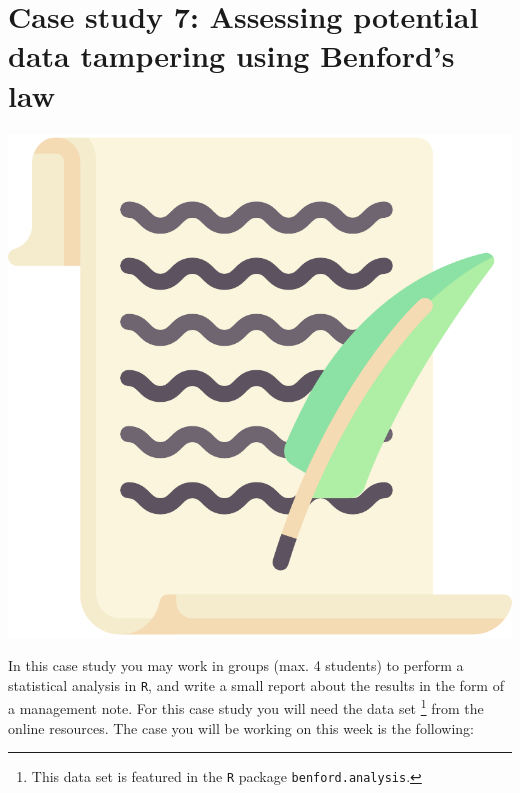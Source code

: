 
\begin{minipage}{0.8\textwidth}
\section{Case study 7: Assessing potential data tampering using Benford's law}
\end{minipage}%
\hfill%
\begin{minipage}{0.1\textwidth}
\includegraphics[width=\linewidth]{Files/Images/lettericon.pdf}
\end{minipage}
\vspace*{.1cm}

In this case study you may work in groups (max. 4 students) to perform a statistical analysis in \texttt{R}, and write a small report about the results in the form of a management note. For this case study you will need the data set \footnote{This data set is featured in the \texttt{R} package \texttt{benford.analysis}.} from the online resources. The case you will be working on this week is the following: \\

